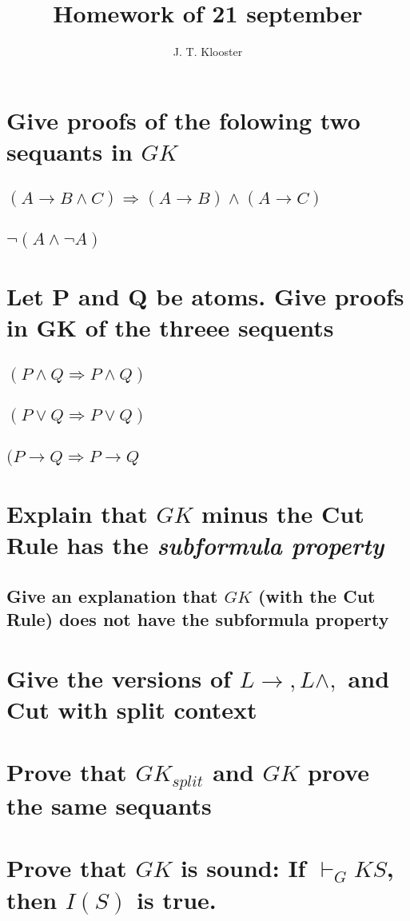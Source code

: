 \documentclass{article}
\begin{document}
\author{J. T. Klooster}
\title{Homework of 21 september}
\maketitle

\section{Give proofs of the folowing two sequants in $GK$}
\subsection{$(A\to B\wedge C)\Rightarrow(A\to B)\wedge(A\to C)$}

\subsection{$\neg(A\wedge\neg A)$}
\section{Let P and Q be atoms. Give proofs in GK of the threee sequents}
\subsection{$(P\wedge Q \Rightarrow P \wedge Q)$}
\subsection{$(P\vee Q \Rightarrow P \vee Q)$}
\subsection{$(P \to Q \Rightarrow P \to Q$}
\section{Explain that $GK$ minus the Cut Rule has the \emph{subformula property}}
\subsection{Give an explanation that $GK$ (with the Cut Rule) does not have
the subformula property}
\section{Give the versions of $L \to, L\wedge,$ and Cut with split context}
\section{Prove that $GK_{split}$ and $GK$ prove the same sequants}
\section{Prove that $GK$ is sound: If $\vdash_GK S$, then $I(S)$ is true.}
\end{document}
